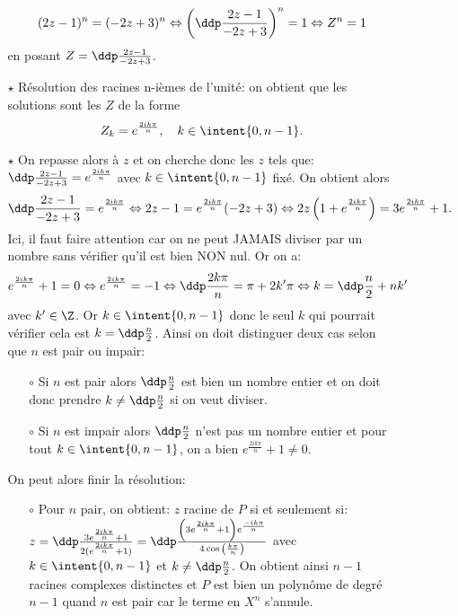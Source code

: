\documentclass[a4paper, 11pt,reqno]{article}
\begin{document}
\begin{correction}
\begin{enumerate}
\begin{itemize}
\begin{itemize}
				                  $$(2z-1)^n=(-2z+3)^n\Leftrightarrow \left( \ddp\frac{2z-1}{-2z+3}\right)^n=1\Leftrightarrow Z^n=1$$
				                  en posant $Z=\ddp\frac{2z-1}{-2z+3}$.
				            \item[$\star$] R\'esolution des racines n-i\`{e}mes de l'unit\'e: on obtient que les solutions sont les $Z$ de la forme
				                  $$Z_k=e^{\frac{2ik\pi}{n}},\quad k\in\intent{ 0,n-1}.$$
				            \item[$\star$] On repasse alors \`{a} $z$ et on cherche donc les $z$ tels que: $\ddp\frac{2z-1}{-2z+3}=e^{\frac{2ik\pi}{n}}$ avec $k\in\intent{ 0,n-1}$ fix\'e. On obtient alors
				                  $$\ddp\frac{2z-1}{-2z+3}=e^{\frac{2ik\pi}{n}}\Leftrightarrow 2z-1=e^{\frac{2ik\pi}{n}} (-2z+3)\Leftrightarrow 2z\left(1+ e^{\frac{2ik\pi}{n}} \right)=3e^{\frac{2ik\pi}{n}}+1.$$
				                  Ici, il faut faire attention car on ne peut JAMAIS diviser par un nombre sans v\'erifier qu'il est bien NON nul. Or on a:
				                  $$e^{\frac{2ik\pi}{n}} +1=0\Leftrightarrow e^{\frac{2ik\pi}{n}} =-1\Leftrightarrow \ddp\frac{2k\pi}{n}=\pi+2k^{\prime}\pi\Leftrightarrow k=\ddp\frac{n}{2}+nk^{\prime}$$
				                  avec $k^{\prime}\in\Z$. Or $k\in\intent{ 0,n-1}$ donc le seul $k$ qui pourrait v\'erifier cela est $k=\ddp\frac{n}{2}$. Ainsi on doit distinguer deux cas selon que $n$ est pair ou impair:
				                  \begin{itemize}
					                  \item[$\circ$] Si $n$ est pair alors $\ddp\frac{n}{2}$ est bien un nombre entier et on doit donc prendre $k\not= \ddp\frac{n}{2}$ si on veut diviser.
					                  \item[$\circ$] Si $n$ est impair alors $\ddp\frac{n}{2}$ n'est pas un nombre entier et pour tout $k\in\intent{ 0,n-1}$, on a bien $e^{\frac{2ik\pi}{n}} +1 \not= 0$.
				                  \end{itemize}
				                  On peut alors finir la r\'esolution:
				                  \begin{itemize}
					                  \item[$\circ$] Pour $n$ pair, on obtient: $z$ racine de $P$ si et seulement si: $z=\ddp\frac{3e^{\frac{2ik\pi}{n}}+1}{2(e^{\frac{2ik\pi}{n}} +1)}=\ddp\frac{\left( 3e^{\frac{2ik\pi}{n}}+1\right) e^{\frac{-ik\pi}{n}}}{4\cos{\left( \frac{k \pi}{n}\right)}}$ avec $k\in\intent{ 0,n-1}$ et $k\not= \ddp\frac{n}{2}$. On obtient ainsi $n-1$ racines complexes distinctes et $P$ est bien un polyn\^{o}me de degr\'e $n-1$ quand $n$ est pair car le terme en $X^n$ s'annule.

\end{itemize}
\end{itemize}
\end{itemize}
\end{enumerate}
\end{correction}
\end{document}
